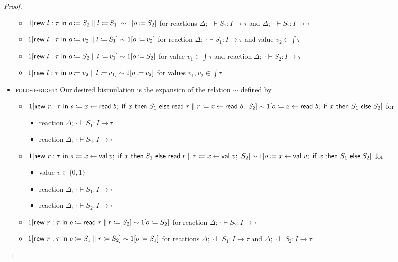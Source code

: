 \begin{proof}
\begin{itemize}
\begin{itemize}
\item $1[\mathsf{new} \ l : \tau \ \mathsf{in} \ o \coloneqq S_2 \; \| \; l \coloneqq S_1] \sim 1[o \coloneqq S_2]$ for reactions $\Delta; \ \cdot \vdash S_1 : I \to \tau$ and $\Delta; \ \cdot \vdash S_2 : I \to \tau$
\item $1[\mathsf{new} \ l : \tau \ \mathsf{in} \ o \coloneqq v_2 \; \| \; l \coloneqq S_1] \sim 1[o \coloneqq v_2]$ for reaction $\Delta; \ \cdot \vdash S_1 : I \to \tau$ and value $v_2 \in \int{\tau}$
\item $1[\mathsf{new} \ l : \tau \ \mathsf{in} \ o \coloneqq S_2 \; \| \; l \coloneqq v_1] \sim 1[o \coloneqq S_2]$ for value $v_1 \in \int{\tau}$ and reaction $\Delta; \ \cdot \vdash S_2 : I \to \tau$
\item $1[\mathsf{new} \ l : \tau \ \mathsf{in} \ o \coloneqq v_2 \; \| \; l \coloneqq v_1] \sim 1[o \coloneqq v_2]$ for values $v_1,v_2 \in\int{\tau}$
\end{itemize}
\item \textsc{fold-if-right}: Our desired bisimulation is the expansion of the relation $\sim$ defined by
\begin{itemize}
\item $1[\new{r}{\tau}{\Par{\assign{o}{x \leftarrow \read{b}; \ \ifte{x}{S_1}{\read{r}}}}{\assign{r}{x \leftarrow \read{b}; \ S_2}}}] \sim \\ 1[\assign{o}{x \leftarrow \read{b}; \ \ifte{x}{S_1}{S_2}}]$ for
\begin{itemize}
\item reaction $\Delta; \ \cdot \vdash S_1 : I \to \tau$
\item reaction $\Delta; \ \cdot \vdash S_2 : I \to \tau$
\end{itemize}
\item $1[\new{r}{\tau}{\Par{\assign{o}{x \leftarrow \val{v}; \ \ifte{x}{S_1}{\read{r}}}}{\assign{r}{x \leftarrow \val{v}; \ S_2}}}] \sim \\ 1[\assign{o}{x \leftarrow \val{v}; \ \ifte{x}{S_1}{S_2}}]$ for
\begin{itemize}
\item value $v \in \{0,1\}$
\item reaction $\Delta; \ \cdot \vdash S_1 : I \to \tau$
\item reaction $\Delta; \ \cdot \vdash S_2 : I \to \tau$
\end{itemize}
\item $1[\mathsf{new} \ r : \tau \ \mathsf{in} \ o \coloneqq \mathsf{read} \ r \; \| \; r \coloneqq S_2] \sim 1[o \coloneqq S_2]$ for reaction $\Delta; \ \cdot \vdash S_2 : I \to \tau$
\item $1[\mathsf{new} \ r : \tau \ \mathsf{in} \ o \coloneqq S_1 \; \| \; r \coloneqq S_2] \sim 1[o \coloneqq S_1]$ for reactions $\Delta; \ \cdot \vdash S_1 : I \to \tau$ and $\Delta; \ \cdot \vdash S_2 : I \to \tau$

\end{itemize}
\end{itemize}
\end{proof}
